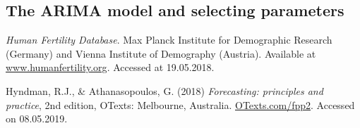 \documentclass[a4paper, 12pt]{scrartcl}
\begin{document}
\subsection{The ARIMA model and selecting parameters}

\begin{thebibliography}{2}
	 \emph{Human Fertility Database}. Max Planck Institute for Demographic Research (Germany) and Vienna Institute of Demography (Austria). Available at \href{www.humanfertility.org}{www.humanfertility.org}. Accessed at 19.05.2018.
	
	 Hyndman, R.J., \& Athanasopoulos, G. (2018) \emph{Forecasting: principles and practice}, 2nd edition, OTexts: Melbourne, Australia. \href{https://otexts.com/fpp2/}{OTexts.com/fpp2}. Accessed on 08.05.2019.
\end{thebibliography}
\end{document}
